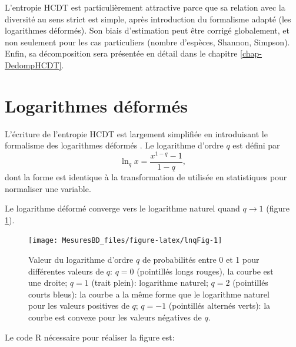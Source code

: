 \documentclass[
  11pt,
  american,
  a4paper,
  extrafontsizes,onecolumn,openright
  ]{memoir}
\begin{document}
L'entropie HCDT est particulièrement attractive parce que sa relation avec la diversité au sens strict est simple, après introduction du formalisme adapté (les logarithmes déformés).
Son biais d'estimation peut être corrigé globalement, et non seulement pour les cas particuliers (nombre d'espèces, Shannon, Simpson).
Enfin, sa décomposition sera présentée en détail dans le chapitre \ref{chap-DedompHCDT}.

\hypertarget{logarithmes-duxe9formuxe9s}{%
\section{Logarithmes déformés}\label{logarithmes-duxe9formuxe9s}}

L'écriture de l'entropie HCDT est largement simplifiée en introduisant le formalisme des logarithmes déformés \autocite{Tsallis1994}.
Le logarithme d'ordre \(q\) est défini par
\begin{equation}
  \label{eq:lnq}
  \ln_q{x} = \frac{x^{1-q} - 1}{1 - q},
\end{equation}
dont la forme est identique à la transformation de \textcite{Box1964} utilisée en statistiques pour normaliser une variable.

Le logarithme déformé converge vers le logarithme naturel quand \(q \to 1\) (figure \ref{fig:lnqFig}).



\scriptsize

\begin{figure}

{\centering \texttt{[image: MesuresBD\_files/figure-latex/lnqFig-1]} 

}

\caption{Valeur du logarithme d'ordre \(q\) de probabilités entre 0 et 1 pour différentes valeurs de \(q\): \(q = 0\) (pointillés longs rouges), la courbe est une droite; \(q = 1\) (trait plein): logarithme naturel; \(q = 2\) (pointillés courts bleus): la courbe a la même forme que le logarithme naturel pour les valeurs positives de \(q\); \(q = -1\) (pointillés alternés verts): la courbe est convexe pour les valeurs négatives de \(q\).}\label{fig:lnqFig}
\end{figure}

\normalsize

Le code R nécessaire pour réaliser la figure est:

\scriptsize
\end{document}
